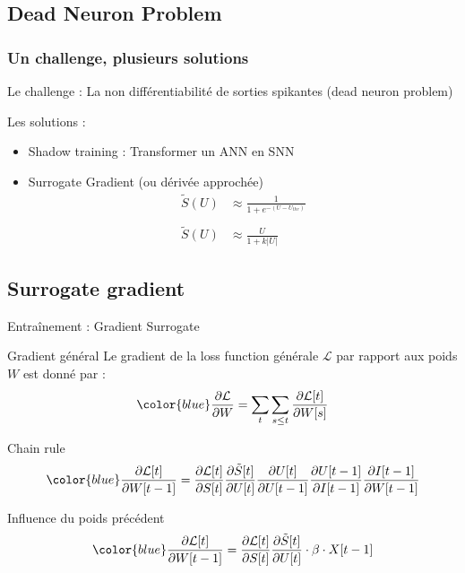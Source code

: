 \documentclass[aspectratio=169]{beamer}
\begin{document}
\subsection{Dead Neuron Problem}

\begin{frame}
  \frametitle{Un challenge, plusieurs solutions}

  Le challenge : La non différentiabilité de sorties spikantes (dead neuron problem)

  Les solutions :
  \begin{itemize}
    \item Shadow training :
          Transformer un ANN en SNN
    \item Surrogate Gradient (ou dérivée approchée)
          $$\begin{aligned}
              \tilde{S}(U) & \approx \frac{1}{1 + e^{-(U - U_{thr})}}       \\                        \\
              \tilde{S}(U) & \approx \frac{U}{1 + k \lvert U \rvert}
            \end{aligned}$$
  \end{itemize}

\end{frame}

\subsection{Surrogate gradient}

\begin{frame}
  \scriptsize{Entraînement : Gradient Surrogate}

  \begin{block}{Gradient général}
    Le gradient de la loss function générale $\mathcal{L}$ par rapport aux poids $W$ est donné par :
    \[
    \color{blue} \frac{\partial \mathcal{L}}{\partial W} = \sum_t \sum_{s\leq t} \frac{\partial\mathcal{L}[t]}{\partial W[s]}
    \]
  \end{block}

  \vspace{1em} %

  \begin{block}{Chain rule}
    \[
    \color{blue} \frac{\partial \mathcal{L}[t]}{\partial W[t-1]} = \frac{\partial \mathcal{L}[t]}{\partial S[t]} \frac{\partial \tilde{S}[t]}{\partial U[t]} \frac{\partial U[t]}{\partial U[t-1]} \frac{\partial U[t-1]}{\partial I[t-1]} \frac{\partial I[t-1]}{\partial W[t-1]}
    \]
  \end{block}

  \vspace{1em} %

  \begin{block}{Influence du poids précédent}
    \[
    \color{blue} \frac{\partial \mathcal{L}[t]}{\partial W[t-1]} = \frac{\partial \mathcal{L}[t]}{\partial S[t]} \frac{\partial \tilde{S}[t]}{\partial U[t]} \cdot \beta \cdot X[t-1]
    \]
  \end{block}
\end{frame}
\end{document}
